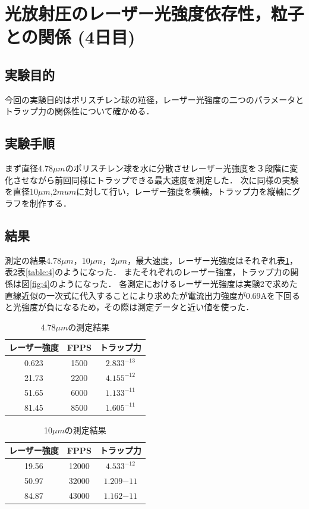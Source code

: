 \documentclass[11pt, a4paper,twocolumn]{jarticle}
\begin{document}
\section{光放射圧のレーザー光強度依存性，粒子との関係 (4日目)}
\subsection{実験目的}
今回の実験目的はポリスチレン球の粒径，レーザー光強度の二つのパラメータとトラップ力の関係性について確かめる．

\subsection{実験手順}
まず直径4.78${\mu}m$のポリスチレン球を水に分散させレーザー光強度を３段階に変化させながら前回同様にトラップできる最大速度を測定した．
次に同様の実験を直径10${\mu}m$,2${mu}m$に対して行い，レーザー強度を横軸，トラップ力を縦軸にグラフを制作する．


\subsection{結果}
測定の結果4.78${\mu}m$，10${\mu}m$，2${\mu}m$，最大速度，レーザー光強度はそれぞれ表\ref{table:2}，表\ref{table:3}表\ref{table:4}のようになった．
またそれぞれのレーザー強度，トラップ力の関係は図\ref{fig:4}のようになった．
各測定におけるレーザー光強度は実験2で求めた直線近似の一次式に代入することにより求めたが電流出力強度が0.69Aを下回ると光強度が負になるため，その際は測定データと近い値を使った．

\begin{table}[htbp]
    \begin{center}
        \begin{tabular}{ccc}
            レーザー強度 & FPPS & トラップ力  \\ \hline
            0.623 & 1500 & $2.833^{-13}$   \\
            21.73 & 2200 & $4.155^{-12}$   \\
            51.65 & 6000 & $1.133^{-11}$  \\
            81.45 & 8500 & $1.605^{-11}$
        \end{tabular}
        \caption{4.78$\mu m$の測定結果}
        \label{table:2}
    \end{center}
\end{table}

\begin{table}[htbp]
    \begin{center}
        \begin{tabular}{ccc}
            レーザー強度 & FPPS & トラップ力  \\ \hline
            19.56 & 12000 & $4.533^{-12}$   \\
            50.97 & 32000 & $1.209{-11}$   \\
            84.87 & 43000 & $1.162{-11}$  \\
        \end{tabular}
        \caption{10$\mu m$の測定結果}
        \label{table:3}
    \end{center}
\end{table}
\end{document}
